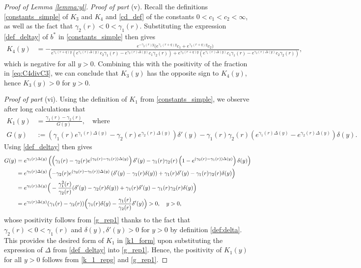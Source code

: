\documentclass[10pt,a4paper]{amsart}
\begin{document}
\begin{proof}[Proof of Lemma \ref{lemma:yl}]
\vspace{1mm}
{\it Proof of part} (v). 
Recall the definitions \eqref{constants_simple} of $K_3$ and $K_4$ and \eqref{cd_def} of the constants $0 < c_1 <  c_2 < \infty$, as well as the fact that $\gamma_2(r) < 0 < \gamma_1(r)$. 
Substituting the expression \eqref{def_deltay} of $b^*$ in \eqref{constants_simple} then gives
\begin{align*}
K_4(y) &= -\frac{e^{-\gamma_2(r)y} \big(e^{\gamma_1(r+q)y} c_1 + e^{\gamma_2(r+q)y} c_2 \big)
    }
    {
    e^{\gamma_1(r+q)y} \left( 
    e^{\gamma_1(r)\Delta(y)} c_2\gamma_1(r) - e^{\gamma_2(r)\Delta(y)} c_1\gamma_2(r)
    \right) 
    + e^{\gamma_2(r+q)y} \left(
    e^{\gamma_1(r)\Delta(y)} c_1\gamma_1(r) - e^{\gamma_2(r)\Delta(y)} c_2\gamma_2(r) \right)
    },
\end{align*}
which is negative for all $y > 0$. 
Combining this with the positivity of the fraction in \eqref{eq:C4divC3}, we can conclude that $K_3(y)$ has the opposite sign to $K_4(y)$, hence $K_3(y) > 0$ for $y > 0$.

\vspace{1mm}
{\it Proof of part} (vi). 
Using the definition of $K_1$ from \eqref{constants_simple}, we observe after long calculations that 
\begin{align}
K_1(y) &= \frac{\gamma_1(r)-\gamma_2(r)}{G(y)}, \quad \text{where} \quad 
\label{k_1_repg}\\ 
G(y)&:= \left( \gamma_1(r) e^{\gamma_1(r)\Delta(y)}  - \gamma_2(r) e^{\gamma_2(r)\Delta(y)}\right)\delta'(y) - \gamma_1(r)\gamma_2(r)\left(e^{\gamma_1(r) \Delta(y)} - e^{\gamma_2(r)\Delta(y)} \right) \delta(y) 
\label{eq:G_y}.
\end{align}
Using \eqref{def_deltay} then gives 
\begin{align}
G(y)
&=e^{\gamma_1(r)\Delta(y)}\left(\left( \gamma_1(r)  - \gamma_2(r) e^{(\gamma_2(r)-\gamma_1(r))\Delta(y)}\right)\delta'(y) - \gamma_1(r)\gamma_2(r)\left(1 - e^{(\gamma_2(r)-\gamma_1(r))\Delta(y)} \right) \delta(y)\right)\notag\\
&=e^{\gamma_1(r)\Delta(y)} \left(-\gamma_2(r)e^{(\gamma_2(r)-\gamma_1(r))\Delta(y)}\left(\delta'(y)-\gamma_1(r)\delta(y)\right)+\gamma_1(r)\delta'(y)-\gamma_1(r)\gamma_2(r)\delta(y)\right)\notag\\
&=e^{\gamma_1(r)\Delta(y)}\Big(-\frac{\gamma_1^2(r)}{\gamma_2(r)}(\delta'(y)-\gamma_2(r)\delta(y))+\gamma_1(r)\delta'(y)-\gamma_1(r)\gamma_2(r)\delta(y)\Big)\notag\\
&=e^{\gamma_1(r)\Delta(y)}(\gamma_1(r)-\gamma_2(r))\Big(\gamma_1(r)\delta(y)-\frac{\gamma_1(r)}{\gamma_2(r)}\delta'(y)\Big) > 0, \quad y > 0,
\label{g_rep1} 
\end{align}
whose positivity follows from \eqref{g_rep1} thanks to the fact that $\gamma_2(r) < 0 < \gamma_1(r)$ and $\delta(y), \delta'(y) > 0$ for $y>0$ by definition \eqref{def:delta}.
This provides the desired form of $K_1$ in \eqref{k1_form} upon substituting the expression of $\Delta$ from \eqref{def_deltay} into \eqref{g_rep1}.
Hence, the positivity of $K_1(y)$ for all $y>0$ follows from \eqref{k_1_repg} and \eqref{g_rep1}.


\end{proof}
\end{document}
